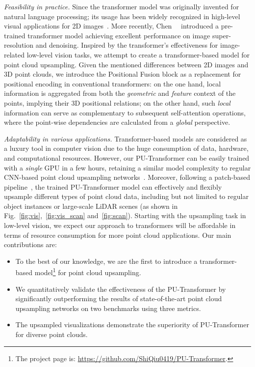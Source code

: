 \emph{Feasibility in practice.} Since the transformer model was originally invented for natural language processing; its usage has been widely recognized in high-level visual applications for 2D images~\cite{carion2020end,dosovitskiy2020image,liu2021swin}. More recently, Chen~\etal~\cite{chen2021pre} introduced a pre-trained transformer model achieving excellent performance on image super-resolution and denoising. Inspired by the transformer's effectiveness for image-related low-level vision tasks, we attempt to create a transformer-based model for point cloud upsampling. Given the mentioned differences between 2D images and 3D point clouds, we introduce the Positional Fusion block as a replacement for positional encoding in conventional transformers: on the one hand, local information is aggregated from both the \emph{geometric} and \emph{feature} context of the points, implying their 3D positional relations; on the other hand, such \emph{local} information can serve as complementary to subsequent self-attention operations, where the point-wise dependencies are calculated from a \emph{global} perspective. 

\emph{Adaptability in various applications.} Transformer-based models are considered as a luxury tool in computer vision due to the huge consumption of data, hardware, and computational resources. However, our PU-Transformer can be easily trained with a \emph{single} GPU in a few hours, retaining a similar model complexity to regular CNN-based point cloud upsampling networks~\cite{yu2018pu,yifan2019patch,li2021point}. Moreover, following a patch-based pipeline~\cite{yifan2019patch}, the trained PU-Transformer model can effectively and flexibly upsample different types of point cloud data, including but not limited to regular object instances or large-scale LiDAR scenes (as shown in Fig.~\ref{fig:vis},~\ref{fig:vis_scan} and~\ref{fig:scan}). Starting with the upsampling task in low-level vision, we expect our approach to transformers will be affordable in terms of resource consumption for more point cloud applications. Our main contributions are:
\begin{itemize}
\item
To the best of our knowledge, we are the first to introduce a transformer-based model\footnote{The project page is: \url{https://github.com/ShiQiu0419/PU-Transformer}.} for point cloud upsampling.

\item We quantitatively validate the effectiveness of the PU-Transformer by significantly outperforming the results of state-of-the-art point cloud upsampling networks on two benchmarks using three metrics.

\item The upsampled visualizations demonstrate the superiority of PU-Transformer for diverse point clouds.
\end{itemize}